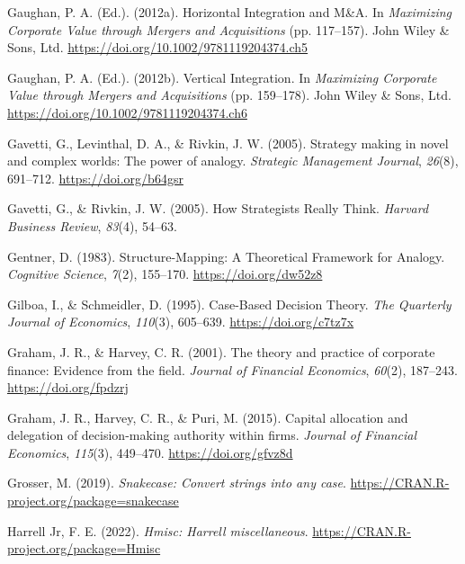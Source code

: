 \documentclass[
  man, donotrepeattitle,floatsintext]{apa7}
\newlength{\cslhangindent}
\newlength{\cslentryspacingunit} %
\newenvironment{CSLReferences}[2] %
 {%
  \setlength{\parindent}{0pt}
  \ifodd #1
  \let\oldpar\par
  \def\par{\hangindent=\cslhangindent\oldpar}
  \fi
  \setlength{\parskip}{#2\cslentryspacingunit}
 }%
 {}
\theoremstyle{definition}
\theoremstyle{definition}
\theoremstyle{definition}
\theoremstyle{definition}
\theoremstyle{remark}
\begin{document}
\begin{CSLReferences}{1}{0}
\leavevmode{}%
Gaughan, P. A. (Ed.). (2012a). Horizontal {Integration} and {M}\&{A}. In \emph{Maximizing {Corporate Value} through {Mergers} and {Acquisitions}} (pp. 117--157). {John Wiley \& Sons, Ltd}. \url{https://doi.org/10.1002/9781119204374.ch5}

\leavevmode{}%
Gaughan, P. A. (Ed.). (2012b). Vertical {Integration}. In \emph{Maximizing {Corporate Value} through {Mergers} and {Acquisitions}} (pp. 159--178). {John Wiley \& Sons, Ltd}. \url{https://doi.org/10.1002/9781119204374.ch6}

\leavevmode{}%
Gavetti, G., Levinthal, D. A., \& Rivkin, J. W. (2005). Strategy making in novel and complex worlds: The power of analogy. \emph{Strategic Management Journal}, \emph{26}(8), 691--712. \url{https://doi.org/b64gsr}

\leavevmode{}%
Gavetti, G., \& Rivkin, J. W. (2005). How {Strategists Really Think}. \emph{Harvard Business Review}, \emph{83}(4), 54--63.

\leavevmode{}%
Gentner, D. (1983). Structure-{Mapping}: {A Theoretical Framework} for {Analogy}. \emph{Cognitive Science}, \emph{7}(2), 155--170. \url{https://doi.org/dw52z8}

\leavevmode{}%
Gilboa, I., \& Schmeidler, D. (1995). Case-{Based Decision Theory}. \emph{The Quarterly Journal of Economics}, \emph{110}(3), 605--639. \url{https://doi.org/c7tz7x}

\leavevmode{}%
Graham, J. R., \& Harvey, C. R. (2001). The theory and practice of corporate finance: Evidence from the field. \emph{Journal of Financial Economics}, \emph{60}(2), 187--243. \url{https://doi.org/fpdzrj}

\leavevmode{}%
Graham, J. R., Harvey, C. R., \& Puri, M. (2015). Capital allocation and delegation of decision-making authority within firms. \emph{Journal of Financial Economics}, \emph{115}(3), 449--470. \url{https://doi.org/gfvz8d}

\leavevmode{}%
Grosser, M. (2019). \emph{Snakecase: Convert strings into any case}. \url{https://CRAN.R-project.org/package=snakecase}

\leavevmode{}%
Harrell Jr, F. E. (2022). \emph{Hmisc: Harrell miscellaneous}. \url{https://CRAN.R-project.org/package=Hmisc}


\end{CSLReferences}
\end{document}
